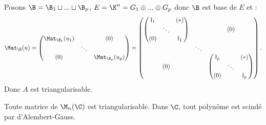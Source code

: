 \documentclass[11pt]{article}
\begin{document}
\begin{prop}{}{}
\begin{equation*}
    \end{equation*}
    Posons $\B=\B_1\sqcup ... \sqcup \B_p$, $E=\K^n=G_1\oplus ... \oplus G_p$ donc $\B$ est base de $E$ et :
    \begin{equation*}
        \Mat_\B(u) = \begin{pmatrix}\Mat_{\B_1}(u_1) &  & (0) \\ & \ddots & \\ (0) & & \Mat_{\B_p}(u_p)\end{pmatrix} = \begin{pmatrix}\begin{pmatrix}\l_1 & & (*) \\ & \ddots & \\ (0) & & \l_1\end{pmatrix} & & (0) \\ & \ddots & \\ (0) & & \begin{pmatrix}\l_p & & (*) \\ & \ddots & \\ (0) & & \l_p \end{pmatrix}\end{pmatrix}.
    \end{equation*}
    Donc $A$ est triangularisable.
\end{prop}

\vspace*{-0.7cm}

\begin{corr}{}{}
    Toute matrice de $\M_n(\C)$ est triangularisable.
    \tcblower
    Dans $\C$, tout polynôme est scindé par d'Alembert-Gauss.
\end{corr}
\end{document}
